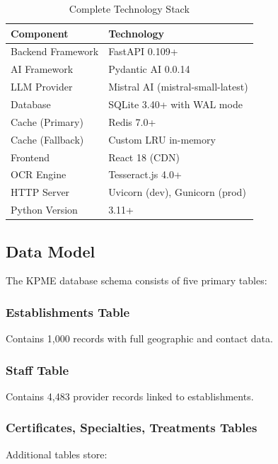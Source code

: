 \documentclass[conference]{IEEEtran}
\begin{document}
\begin{table}[htbp]
\caption{Complete Technology Stack}
\begin{center}
\begin{tabular}{|l|l|}
\hline
\textbf{Component} & \textbf{Technology} \\
\hline
Backend Framework & FastAPI 0.109+ \\
AI Framework & Pydantic AI 0.0.14 \\
LLM Provider & Mistral AI (mistral-small-latest) \\
Database & SQLite 3.40+ with WAL mode \\
Cache (Primary) & Redis 7.0+ \\
Cache (Fallback) & Custom LRU in-memory \\
Frontend & React 18 (CDN) \\
OCR Engine & Tesseract.js 4.0+ \\
HTTP Server & Uvicorn (dev), Gunicorn (prod) \\
Python Version & 3.11+ \\
\hline
\end{tabular}
\label{tab:tech_stack}
\end{center}
\end{table}

\subsection{Data Model}

The KPME database schema consists of five primary tables:

\subsubsection{Establishments Table}

Contains 1,000 records with full geographic and contact data.

\subsubsection{Staff Table}

Contains 4,483 provider records linked to establishments.

\subsubsection{Certificates, Specialties, Treatments Tables}

Additional tables store:
\end{document}
